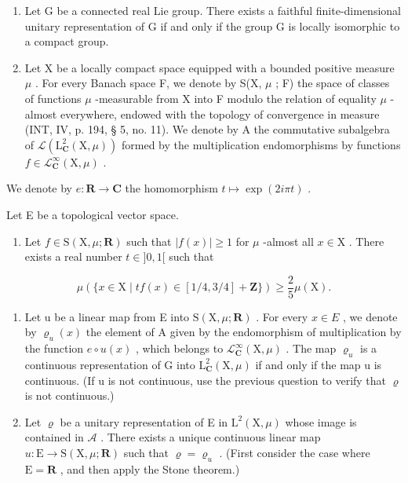 \begin{enumerate}
\def\labelenumi{\arabic{enumi})}
\setcounter{enumi}{16}
\item
  Let G be a connected real Lie group. There exists a faithful finite-dimensional unitary representation of G if and only if the group G is locally isomorphic to a compact group.
\item
  Let X be a locally compact space equipped with a bounded positive measure \(\mu\) . For every Banach space F, we denote by S(X, \(\mu\) ; F) the space of classes of functions \(\mu\) -measurable from X into F modulo the relation of equality \(\mu\) -almost everywhere, endowed with the topology of convergence in measure (INT, IV, p. 194, § 5, no. 11). We denote by A the commutative subalgebra of \(\mathcal{L}(\mathrm{L}_{\mathbf{C}}^{2}(\mathrm{X},\mu))\) formed by the multiplication endomorphisms by functions \(f \in \mathcal{L}_{\mathbf{C}}^{\infty}(\mathrm{X},\mu)\) .
\end{enumerate}

We denote by \(e\colon \mathbf{R}\to \mathbf{C}\) the homomorphism \(t\mapsto \exp (2i\pi t)\) .

Let E be a topological vector space.

\begin{enumerate}
\def\labelenumi{\alph{enumi})}
\tightlist
\item
  Let \(f \in \mathrm{S}(\mathrm{X}, \mu; \mathbf{R})\) such that \(|f(x)| \geqslant 1\) for \(\mu\) -almost all \(x \in \mathrm{X}\) . There exists a real number \(t \in ]0, 1[\) such that
\end{enumerate}

\[
\mu (\{x \in \mathrm{X} \mid t f (x) \in [ 1 / 4, 3 / 4 ] + \mathbf {Z} \}) \geqslant \frac {2}{5} \mu (\mathrm{X}).
\]

\begin{enumerate}
\def\labelenumi{\alph{enumi})}
\setcounter{enumi}{1}
\item
  Let u be a linear map from E into \(\mathrm{S}(\mathrm{X},\mu;\mathbf{R})\) . For every \(x\in E\) , we denote by \(\varrho_{u}(x)\) the element of A given by the endomorphism of multiplication by the function \(e\circ u(x)\) , which belongs to \(\mathcal{L}_{\mathbf{C}}^{\infty}(\mathrm{X},\mu)\) . The map \(\varrho_{u}\) is a continuous representation of G into \(\mathrm{L}_{\mathbf{C}}^{2}(\mathrm{X},\mu)\) if and only if the map u is continuous. (If u is not continuous, use the previous question to verify that \(\varrho\) is not continuous.)
\item
  Let \(\varrho\) be a unitary representation of E in \(\mathrm{L}^2 (\mathrm{X},\mu)\) whose image is contained in \(\mathcal{A}\) . There exists a unique continuous linear map \(u\colon \mathrm{E}\to \mathrm{S}(\mathrm{X},\mu ;\mathbf{R})\) such that \(\varrho = \varrho_{u}\) . (First consider the case where \(\mathrm{E} = \mathbf{R}\) , and then apply the Stone theorem.)
\end{enumerate}

